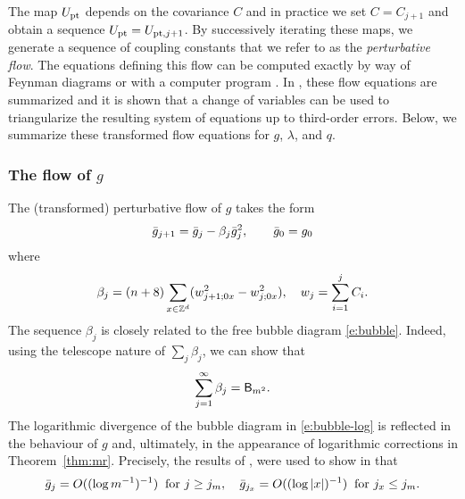 
The map $U_{\rm pt}$ depends on the covariance $C$ and
in practice we set $C = C_{j+1}$ and obtain a sequence $U_{\rm pt} = U_{\mathrm{pt},j+1}$.
By successively iterating these maps, we generate a sequence of coupling constants that
we refer to as the \emph{perturbative flow}. The equations defining this flow can be
computed exactly by way of Feynman diagrams or with a computer program \cite{BBS-rg-ptsoft}.
In \cite{BBS-rg-pt}, these flow equations are summarized and it is shown that a change of
variables can be used to triangularize the resulting system of equations up to third-order
errors. Below, we summarize these transformed flow equations for $g$, $\lambda$, and $q$.

\subsubsection{The flow of \texorpdfstring{$g$}{g}}

The (transformed) perturbative flow of $g$ takes the form
\begin{equation}
\label{e:gbar}
\bar{g}_{j+1}
	=
\bar{g}_j - \beta_j  \bar{g}_j^{2}, \qquad \bar{g}_0
	=
g_0
\end{equation}
where
\begin{equation}
\beta_j = (n + 8) \sum_{x\in{ {{\mathbb Z}}^d }} (w_{j+1;0x}^2 - w_{j;0x}^2),
	\quad
w_j = \sum_{i=1}^j C_i.
\end{equation}
The sequence $\beta_j$ is closely related to the free bubble diagram
\eqref{e:bubble}. Indeed, using the telescope nature of $\sum_j \beta_j$,
we can show that
\begin{equation}
\sum_{j=1}^\infty \beta_j
	=
{\sf B}_{m^2}.
\end{equation}
The logarithmic divergence of the bubble diagram in \eqref{e:bubble-log} is
reflected in the behaviour of $g$ and, ultimately, in the appearance of logarithmic
corrections in Theorem~\ref{thm:mr}. Precisely, the results of \cite{BBS-rg-flow},
were used to show in
\cite[Proposition~\ref{log-prop:approximate-flow}]{BBS-saw4-log}
that
\begin{equation}
\label{e:gjxgjmbd}
\bar{g}_{j}
	=
O((\log m^{-1})^{-1}) \;\; \text{for $j \geq j_m$},
	\quad
\bar{g}_{j_x}
	=
O((\log |x|)^{-1}) \;\; \text{for $j_x \leq j_m$.}
\end{equation}

